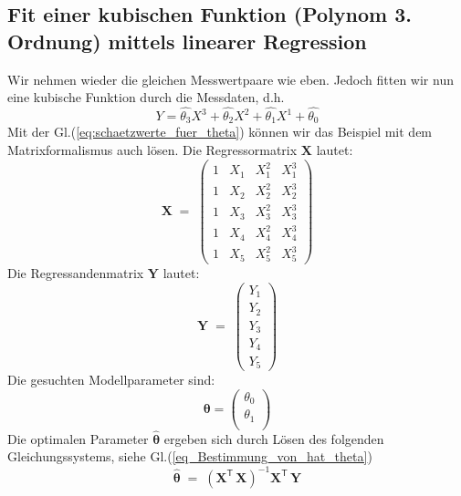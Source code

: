 \subsection{Fit einer kubischen Funktion (Polynom 3. Ordnung) mittels linearer Regression}
Wir nehmen wieder die gleichen Messwertpaare wie eben. Jedoch fitten wir
nun eine kubische Funktion durch die Messdaten, d.h.
\begin{equation}
Y = \hat{\theta_3} X^3 + \hat{\theta_2} X^2 + \hat{\theta_1} X^1 +
\hat{\theta_0}
\end{equation}
Mit der Gl.(\ref{eq:schaetzwerte_fuer_theta}) können wir
das Beispiel mit dem Matrixformalismus auch lösen.
Die Regressormatrix $\boldsymbol X$ lautet:
\begin{equation}
	\boldsymbol{X} \; = \;
	\left(
	\begin{array}{cccc}
		1 & X_1 & X_1^2 & X_1^3 \\
		1 & X_2 & X_2^2 & X_2^3 \\
		1 & X_3 & X_3^2 & X_3^3\\
		1 & X_4 & X_4^2 & X_4^3\\
		1 & X_5 & X_5^2 & X_5^3
	\end{array}
	\right)
\end{equation}
Die Regressandenmatrix $\boldsymbol Y$ lautet:
\begin{equation}
	\boldsymbol{Y} \; = \;
	\left(
	\begin{array}{cc}
		Y_1 \\
		Y_2 \\
		Y_3 \\
		Y_4 \\
		Y_5
	\end{array}
	\right)
\end{equation}
Die gesuchten Modellparameter sind:
\[
\boldsymbol\theta = \left(
\begin{array}{cc}
	\theta_0 \\
	\theta_1 \\
\end{array}
\right)
\]
Die optimalen Parameter $\boldsymbol{\hat \theta}$ ergeben sich durch Lösen
des folgenden Gleichungssystems, siehe Gl.(\ref{eq_Bestimmung_von_hat_theta})
\[
\boldsymbol{\hat \theta} \; = \;
\left( \mathbf{X}^\mathsf{T}  \, \mathbf{X} \right)^{-1} \mathbf{X}^\mathsf{T} \, \mathbf{Y}
\]

